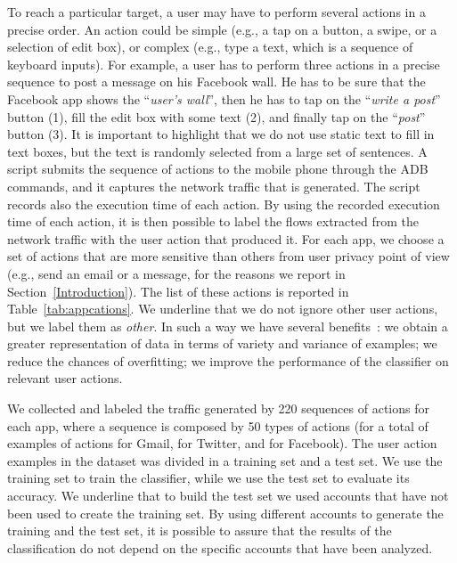 \documentclass{acm_proc_article-sp}
\newcommand{\hilight}[1]{#1}
\begin{document}
To reach a particular target, a user may have to perform several actions in 
a precise order. An action could 
be simple (e.g., a tap on a button, a swipe, or a selection of 
edit box), or complex (e.g., type a text, which is a sequence of keyboard inputs).
For example, a user has to perform three actions in a precise sequence to post a message on his Facebook wall.
He has to be sure that the Facebook app shows the ``\emph{user's wall}'', 
then he has to tap on the ``\emph{write a post}'' button (1), fill the edit box with some text (2), and finally tap on the ``\emph{post}'' button (3). It is important to highlight that we do not use static text to fill in 
text boxes, but the text is randomly selected from a large set of sentences.
A script submits the sequence of actions to the
mobile phone through the ADB commands, and it 
captures the network traffic that is generated.
\hilight{The script records also the execution time of each action.
By using the recorded execution time of each action, it is then possible to label the flows extracted from the 
network traffic with the user action that produced it.}
\hilight{For each app, we choose a set of actions that are more sensitive than others from user privacy point of view (e.g., send an email or a message, for the reasons we report in} Section~\ref{Introduction}).
The list of these actions is reported in Table~\ref{tab:appcations}. 
\hilight{We underline that we do not ignore other user actions, but we label them as \emph{other}.
In such a way we have several benefits}~\cite{mitchell1997machine}:
\hilight{we obtain a greater representation of data in terms of variety and variance of examples; 
we reduce the chances of overfitting; we improve the performance of the classifier on relevant user actions.}


\hilight{We collected and labeled the traffic generated by 220 sequences of actions for each app, where a sequence is composed by 50 types of actions 
(for a total of  examples of actions for Gmail,  for Twitter, and  for Facebook).
The user action examples in the dataset was divided in a training set  and a test set.
We use the training set to train the classifier, while we use the test set to evaluate its accuracy. 
We underline that to build the test set we used accounts that have not been used to create the training set.
By using different accounts to generate 
the training and the test set, it is possible to assure that the results 
of the classification do not depend on the specific accounts that have been 
analyzed.}
\end{document}
